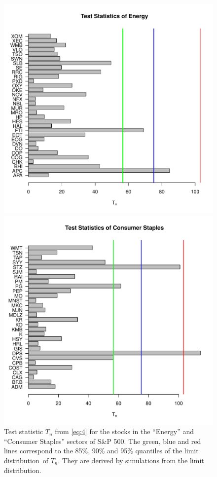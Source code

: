 \documentclass[11pt,a4]{amsart}
\newcommand{\ds}{distribution}
\newcommand{\1}{{\mathbf 1}}
\begin{document}
\begin{figure}[htb!]
  \begin{minipage}{0.5\linewidth}
    \includegraphics[width=\textwidth]
    {Hoga_Energy_Single.pdf}
  \end{minipage}\hfill
  \begin{minipage}{0.5\linewidth}
    \includegraphics[width=\textwidth]
    {Hoga_CS_Single.pdf}
  \end{minipage}
  \caption{Test statistic $T_n$ from \eqref{eq:4} for the  stocks in the ``Energy'' and
    ``Consumer Staples'' sectors of S\&P 500. The green, blue and red
    lines correspond to the 85\%, 90\% and 95\% quantiles of the limit \ds\ of $T_n$.  They are derived
by simulations from the limit \ds .}
  \label{fig:Hoga_Single}
\end{figure}
\end{document}
